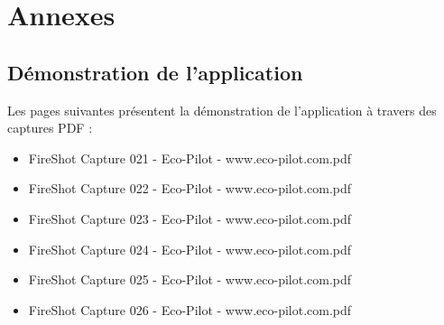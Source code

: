 \documentclass[12pt,a4paper]{report}
\begin{document}

\appendix
\chapter{Annexes}

\section{Démonstration de l'application}
Les pages suivantes présentent la démonstration de l'application à travers des captures PDF :
\begin{itemize}
    \item FireShot Capture 021 - Eco-Pilot - www.eco-pilot.com.pdf
    \item FireShot Capture 022 - Eco-Pilot - www.eco-pilot.com.pdf
    \item FireShot Capture 023 - Eco-Pilot - www.eco-pilot.com.pdf
    \item FireShot Capture 024 - Eco-Pilot - www.eco-pilot.com.pdf
    \item FireShot Capture 025 - Eco-Pilot - www.eco-pilot.com.pdf
    \item FireShot Capture 026 - Eco-Pilot - www.eco-pilot.com.pdf
\end{itemize}









\end{document}
